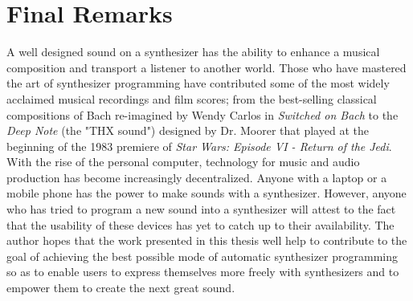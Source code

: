 \section{Final Remarks}
A well designed sound on a synthesizer has the ability to enhance a musical composition and transport a listener to another world. Those who have mastered the art of synthesizer programming have contributed some of the most widely acclaimed musical recordings and film scores; from the best-selling classical compositions of Bach re-imagined by Wendy Carlos in \textit{Switched on Bach} to the \textit{Deep Note} (the "THX sound") designed by Dr. Moorer that played at the beginning of the 1983 premiere of \textit{Star Wars: Episode VI - Return of the Jedi}. With the rise of the personal computer, technology for music and audio production has become increasingly decentralized. Anyone with a laptop or a mobile phone has the power to make sounds with a synthesizer. However, anyone who has tried to program a new sound into a synthesizer will attest to the fact that the usability of these devices has yet to catch up to their availability. The author hopes that the work presented in this thesis well help to contribute to the goal of achieving the best possible mode of automatic synthesizer programming so as to enable users to express themselves more freely with synthesizers and to empower them to create the next great sound.

